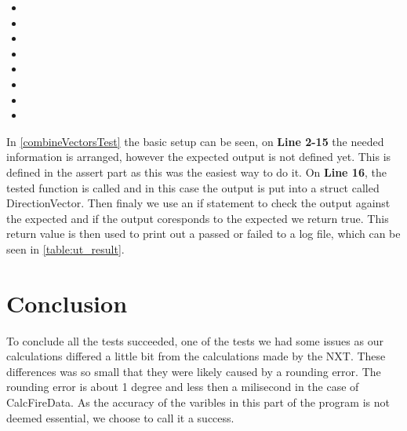 \begin{itemize}
  \item {}
  \item {}
  \item {}
  \item {}
  \item {}
  \item {}
  \item {}
  \item {}
\end{itemize} 

In \autoref{combineVectorsTest} the basic setup can be seen, on \textbf{Line
2-15} the needed information is arranged, however the expected output is not
defined yet. This is defined in the assert part as this was the easiest way to
do it. On \textbf{Line 16}, the tested function is called and in this case the
output is put into a struct called DirectionVector. Then finaly we use an if
statement to check the output against the expected and if the output coresponds
to the expected we return true. This return value is then used to print out a
passed or failed to a log file, which can be seen in \autoref{table:ut_result}.\nl


\section{Conclusion}
To conclude all the tests succeeded, one of the tests we had some issues as our
calculations differed a little bit from the calculations made by the NXT. These
differences was so small that they were likely caused by a rounding error.
The rounding error is about 1 degree and less then a milisecond in the case of
CalcFireData. As the accuracy of the varibles in this part
of the program is not deemed essential, we choose to call it a success.
